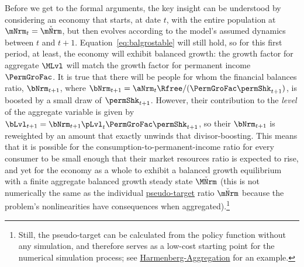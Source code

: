 \documentclass[\econtexRoot/BufferStockTheory]{subfiles}
\begin{document}
Before we get to the formal arguments, the key insight can be understood by considering an economy that starts, at date $t$, with the entire population at $\mNrm_{t}=\mBalLvl$, but then evolves according to the model's assumed dynamics between $t$ and $t+1$.
Equation~\eqref{eq:balgrostable} will still hold, so for this first period, at least, the economy will exhibit balanced growth: the growth factor for aggregate $\MLvl$ will match the growth factor for permanent income $\PermGroFac$.
It is true that there will be people for whom the financial balances ratio, $\bNrm_{t+1}$, where $\bNrm_{t+1} = \aNrm_{t}\Rfree/(\PermGroFac\permShk_{t+1})$, is boosted by a small draw of $\permShk_{t+1}$.
However, their contribution to the \textit{level} of the aggregate variable is given by $\bLvl_{t+1}=\bNrm_{t+1}\pLvl_{t}\PermGroFac\permShk_{t+1}$, so their $\bNrm_{t+1}$ is reweighted by an amount that exactly unwinds that divisor-boosting.
This means that it is possible for the consumption-to-permanent-income ratio for every consumer to be small enough that their market resources ratio is expected to rise, and yet for the economy as a whole to exhibit a balanced growth equilibrium with a finite aggregate balanced growth steady state $\BalGroFac{\MNrm}$ (this is not numerically the same as the individual \hyperlink{pseudo-steady-state}{pseudo-target} ratio $\mBalLvl$ because the problem's nonlinearities have consequences when aggregated).\footnote{Still, the pseudo-target can be calculated from the policy function without any simulation, and therefore serves as a low-cost starting point for the numerical simulation process; see \href{https://econ-ark.org/materials/harmenberg-aggregation?launch}{Harmenberg-Aggregation} for an example.}
\end{document}
